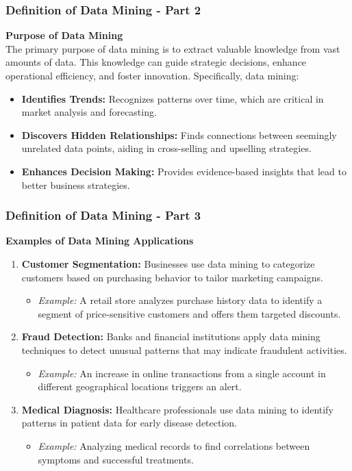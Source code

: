 \documentclass{beamer}
\begin{document}
\begin{frame}[fragile]
    \frametitle{Definition of Data Mining - Part 2}
    \textbf{Purpose of Data Mining}\\
    The primary purpose of data mining is to extract valuable knowledge from vast amounts of data. This knowledge can guide strategic decisions, enhance operational efficiency, and foster innovation. Specifically, data mining:
    \begin{itemize}
        \item \textbf{Identifies Trends:} Recognizes patterns over time, which are critical in market analysis and forecasting.
        \item \textbf{Discovers Hidden Relationships:} Finds connections between seemingly unrelated data points, aiding in cross-selling and upselling strategies.
        \item \textbf{Enhances Decision Making:} Provides evidence-based insights that lead to better business strategies.
    \end{itemize}
\end{frame}

\begin{frame}[fragile]
    \frametitle{Definition of Data Mining - Part 3}
    \textbf{Examples of Data Mining Applications}\\
    \begin{enumerate}
        \item \textbf{Customer Segmentation:} Businesses use data mining to categorize customers based on purchasing behavior to tailor marketing campaigns.
            \begin{itemize}
                \item \textit{Example:} A retail store analyzes purchase history data to identify a segment of price-sensitive customers and offers them targeted discounts.
            \end{itemize}
        \item \textbf{Fraud Detection:} Banks and financial institutions apply data mining techniques to detect unusual patterns that may indicate fraudulent activities.
            \begin{itemize}
                \item \textit{Example:} An increase in online transactions from a single account in different geographical locations triggers an alert.
            \end{itemize}
        \item \textbf{Medical Diagnosis:} Healthcare professionals use data mining to identify patterns in patient data for early disease detection.
            \begin{itemize}
                \item \textit{Example:} Analyzing medical records to find correlations between symptoms and successful treatments.
            \end{itemize}
    \end{enumerate}
\end{frame}
\end{document}
